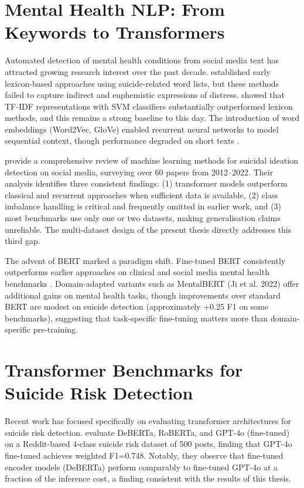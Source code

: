\documentclass[12pt, a4paper, oneside]{report}
\begin{document}
\section{Mental Health NLP: From Keywords to Transformers}

Automated detection of mental health conditions from social media text has attracted growing research interest over the past decade. \citet{pestian2012sentiment} established early lexicon-based approaches using suicide-related word lists, but these methods failed to capture indirect and euphemistic expressions of distress. \citet{coppersmith2014quantifying} showed that TF-IDF representations with SVM classifiers substantially outperformed lexicon methods, and this remains a strong baseline to this day. The introduction of word embeddings (Word2Vec, GloVe) enabled recurrent neural networks to model sequential context, though performance degraded on short texts \citep{yates2017depression}.

\citet{abdulsalam2022review} provide a comprehensive review of machine learning methods for suicidal ideation detection on social media, surveying over 60 papers from 2012--2022. Their analysis identifies three consistent findings: (1) transformer models outperform classical and recurrent approaches when sufficient data is available, (2) class imbalance handling is critical and frequently omitted in earlier work, and (3) most benchmarks use only one or two datasets, making generalisation claims unreliable. The multi-dataset design of the present thesis directly addresses this third gap.

The advent of BERT \citep{devlin2019bert} marked a paradigm shift. Fine-tuned BERT consistently outperforms earlier approaches on clinical and social media mental health benchmarks \citep{ji2022survey}. Domain-adapted variants such as MentalBERT (Ji et al. 2022) offer additional gains on mental health tasks, though improvements over standard BERT are modest on suicide detection (approximately +0.25 F1 on some benchmarks), suggesting that task-specific fine-tuning matters more than domain-specific pre-training.

\section{Transformer Benchmarks for Suicide Risk Detection}

Recent work has focused specifically on evaluating transformer architectures for suicide risk detection. \citet{pokrywka2024transformers} evaluate DeBERTa, RoBERTa, and GPT-4o (fine-tuned) on a Reddit-based 4-class suicide risk dataset of 500 posts, finding that GPT-4o fine-tuned achieves weighted F1=0.748. Notably, they observe that fine-tuned encoder models (DeBERTa) perform comparably to fine-tuned GPT-4o at a fraction of the inference cost, a finding consistent with the results of this thesis.
\end{document}
